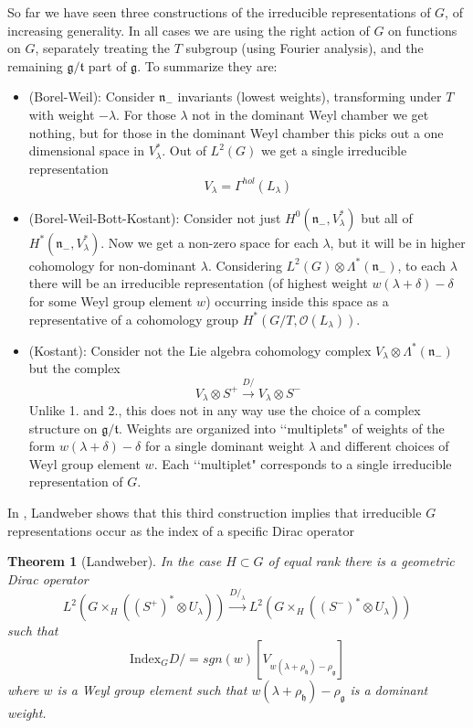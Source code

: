 \documentclass[a4paper,a4paper]{article}
\newtheorem{theorem}{Theorem}
\theoremstyle{conjecture}
\def\Slash#1{#1\!\!\!\!/}
\def\Dirac{\Slash D}
\begin{document}
So far we have seen three constructions of the irreducible representations of
$G$, of increasing generality.  In all cases we are using the
right action of $G$ on functions on $G$, separately treating the $T$ subgroup (using
Fourier analysis), and the remaining $\mathfrak g/\mathfrak t$ part of $\mathfrak g$.
To summarize they are:
\begin{itemize}

\item (Borel-Weil):  Consider $\mathfrak n_-$ invariants (lowest weights), transforming
under $T$ with weight $-\lambda$. For those $\lambda$ not in the dominant Weyl
chamber we get nothing, but for those in the dominant Weyl chamber this picks
out a one dimensional space in $V_\lambda^*$.  Out of $L^2(G)$ we get a single irreducible
representation
$$V_\lambda=\Gamma^{hol}(L_\lambda)$$

\item (Borel-Weil-Bott-Kostant):  Consider not just $H^0(\mathfrak n_-,V^*_\lambda)$ but
all of $H^*(\mathfrak n_-,V^*_\lambda)$.  Now we get a non-zero space
for each $\lambda$, but it will be in higher cohomology for
non-dominant $\lambda$. Considering $L^2(G)\otimes
\Lambda^*(\mathfrak n_-)$, to each $\lambda$ there will be an
irreducible representation (of highest weight $w(\lambda
+\delta)-\delta$ for some Weyl group element $w$) occurring inside
this space as a representative of a cohomology group
$H^*(G/T,{\mathcal O}(L_\lambda))$.

\item (Kostant): Consider not the Lie algebra cohomology complex
$V_\lambda\otimes\Lambda^*(\mathfrak n_-)$ but the complex
$$V_\lambda\otimes S^+\stackrel{\Dirac}\longrightarrow V_\lambda\otimes S^-$$
Unlike 1. and 2., this does not in any way use the choice of a complex
structure on $\mathfrak g/\mathfrak t$.  Weights are
organized into \lq\lq multiplets" of weights of
the form $w(\lambda +\delta)-\delta$ for a single dominant weight $\lambda$ and
different choices of Weyl group element $w$.  Each \lq\lq multiplet" corresponds
to a single irreducible representation of $G$.

\end{itemize}

In \cite{Landweber1}, Landweber shows that this third construction implies
that irreducible $G$ representations occur as the index of a specific
Dirac operator

\begin{theorem}[Landweber]
In the case $H\subset G$ of equal rank there is a geometric Dirac operator
$$L^2(G\times_H((S^+)^*\otimes U_\lambda))\stackrel{\Dirac_\lambda}\longrightarrow
L^2(G\times_H((S^-)^*\otimes U_\lambda))$$
such that
$$\text{Index}_G \Dirac = sgn(w) [V_{w(\lambda +\rho_\mathfrak h)-\rho_\mathfrak g}]$$
where $w$ is a Weyl group element such that $w(\lambda +\rho_\mathfrak h)-\rho_\mathfrak g$ is
a dominant weight.
\end{theorem}
\end{document}
